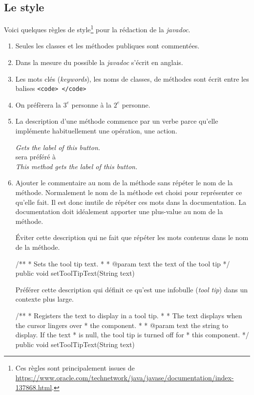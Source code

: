 \subsection{Le style}

Voici quelques règles de style\footnote{Ces règles sont principalement issues de \url{https://www.oracle.com/technetwork/java/javase/documentation/index-137868.html}.} pour la rédaction de la \textit{javadoc}.

\begin{enumerate}
	
	\item Seules les classes et les méthodes publiques sont commentées. 

	\item Dans la mesure du possible la \textit{javadoc} s'écrit en anglais. 

	\item Les mots clés (\textit{keywords}), les noms de classes, de méthodes
		sont écrit entre les balises \texttt{<code> </code>} 

	\item On préfèrera la $3^e$ personne à la $2^e$ personne. 

	\item La description d'une méthode commence par un verbe parce qu'elle
		implémente habituellement une opération, une action. 
	
		\medskip 
		\textit{Gets the label of this button.} \\
		sera préféré à \\
		\textit{This method gets the label of this button.}

	\item Ajouter le commentaire au nom de la méthode sans répéter le nom de la
		méthode. Normalement le nom de la méthode est choisi pour représenter
		ce qu'elle fait. Il est donc inutile de répéter ces mots dans la
		documentation. La documentation doit idéalement apporter une plus-value
		au nom de la méthode. 

		\medskip
		Éviter cette description qui ne fait que répéter les mots contenus 
		dans le nom de la méthode.
		\begin{java}
		/**
		  * Sets the tool tip text.
		  *
		  * @param text the text of the tool tip
		  */
		  public void setToolTipText(String text)
		\end{java}
		
		Préférer cette description qui définit ce qu'est une infobulle 
		(\textit{tool tip}) dans un contexte plus large. 
		\begin{java}
		/**
		  * Registers the text to display in a tool tip. 
		  * 
		  * The text displays when the cursor lingers over 
		  * the component.         
		  *
		  * @param text the string to display. If the text 
		  * is null, the tool tip is turned off for 
		  * this component. 
		  */
		  public void setToolTipText(String text)
		\end{java}


\end{enumerate}
